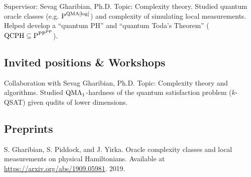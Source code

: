 \documentclass[11pt,letterpaper,serif]{moderncv}
\begin{document}
{
	\begin{adjustwidth}{.25in}{}
		Supervisor: Sevag Gharibian, Ph.D. \newline
		Topic: Complexity theory. Studied quantum oracle classes  (e.g. {\scriptsize $\textup{P}^{\textup{QMA[log]}}$}) and complexity of simulating local measurements. Helped develop a ``quantum PH'' and ``quantum Toda's Theorem'' ({\scriptsize $\textup{QCPH}\subseteq \textup{P}^{\textup{PP}^{\textup{PP}}}$}).
	\end{adjustwidth}
}


\subsection{Invited positions \& Workshops}

{
}

{
	\begin{adjustwidth}{.25in}{}
		Collaboration with Sevag Gharibian, Ph.D. \newline
		Topic: Complexity theory and algorithms. Studied $\textup{QMA}_{1}$-hardness of the quantum satisfaction problem ($k$-QSAT) given qudits of lower dimensions.
	\end{adjustwidth}
}


\subsection{Preprints}
{ \leftskip 0.2in \parindent -0.2in %

S. Gharibian, S. Piddock, and J. Yirka. Oracle complexity classes and local measurements on physical Hamiltonians. Available at \url{https://arxiv.org/abs/1909.05981}. 2019.


} %


\end{document}
